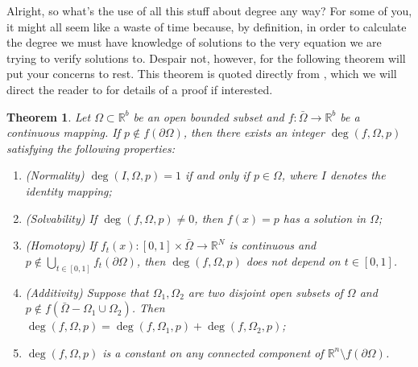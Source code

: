 \documentclass[11pt]{article}
\theoremstyle{plain}
\newtheorem{thm}{Theorem}[section]
\theoremstyle{definition}
\theoremstyle{remark}
\begin{document}
Alright, so what's the use of all this stuff about degree any way? For some of you, it might all seem like a waste of time because, by definition, in order to calculate the degree we must have knowledge of solutions to the very equation we are trying to verify solutions to. Despair not, however, for the following theorem will put your concerns to rest. 
This theorem is quoted directly from \cite{OrChCh2006}, which we will direct the reader to for details of a proof if interested. 

\begin{thm} \label{DegThm}
Let $\Omega\subset\mathbb{R}^b$ be an open bounded subset and $f:\bar{\Omega}\rightarrow\mathbb{R}^b$ be a continuous mapping. If $p\not\in f\left(\partial\Omega\right)$, then there exists an integer $\operatorname{deg}\left(f, \Omega,p\right)$ satisfying the following properties:
\begin{enumerate}
\item (Normality) $\operatorname{deg}\left(I, \Omega,p\right)=1$ if and only if $p\in\Omega$, where $I$ denotes the identity mapping;
\item (Solvability) If $\operatorname{deg}\left(f, \Omega,p\right)\not= 0$, then $f(x)=p$ has a solution in $\Omega$;
\item (Homotopy) If $f_t(x):[0,1]\times\bar{\Omega}\rightarrow\mathbb{R}^N$ is continuous and $p\not\in \bigcup\limits_{t\in[0,1]}f_t\left(\partial\Omega\right)$, then $\operatorname{deg}\left(f, \Omega,p\right)$ does not depend on $t\in[0,1]$. 
\item (Additivity) Suppose that $\Omega_1, \Omega_2$ are two disjoint open subsets of $\Omega$ and $p\not\in f\left(\bar{\Omega}-\Omega_1\cup\Omega_2\right)$. Then $\operatorname{deg}\left(f, \Omega,p\right)=\operatorname{deg}\left(f, \Omega_1,p\right)+\operatorname{deg}\left(f, \Omega_2,p\right)$;
\item $\operatorname{deg}\left(f, \Omega,p\right)$ is a constant on any connected component of $\mathbb{R}^n\setminus f(\partial\Omega)$. 
\end{enumerate}
\end{thm}
\end{document}
